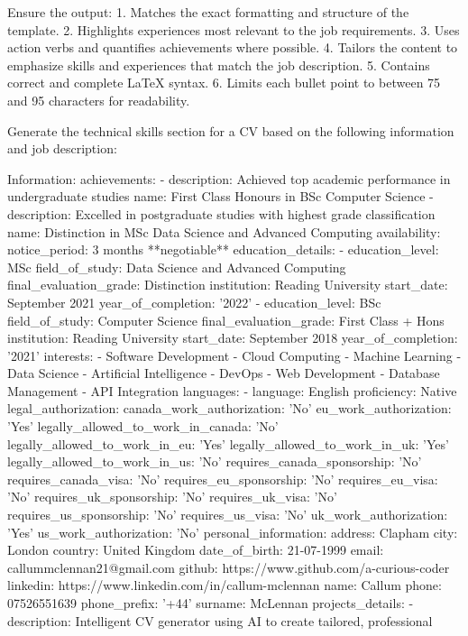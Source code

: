 \documentclass{resume}
\begin{document}
    Ensure the output:
    1. Matches the exact formatting and structure of the template.
    2. Highlights experiences most relevant to the job requirements.
    3. Uses action verbs and quantifies achievements where possible.
    4. Tailors the content to emphasize skills and experiences that match the job description.
    5. Contains correct and complete LaTeX syntax.
    6. Limits each bullet point to between 75 and 95 characters for readability.
    


    Generate the technical skills section for a CV based on the following information and job description:

    Information:
    achievements:
- description: Achieved top academic performance in undergraduate studies
  name: First Class Honours in BSc Computer Science
- description: Excelled in postgraduate studies with highest grade classification
  name: Distinction in MSc Data Science and Advanced Computing
availability:
  notice_period: 3 months **negotiable**
education_details:
- education_level: MSc
  field_of_study: Data Science and Advanced Computing
  final_evaluation_grade: Distinction
  institution: Reading University
  start_date: September 2021
  year_of_completion: '2022'
- education_level: BSc
  field_of_study: Computer Science
  final_evaluation_grade: First Class + Hons
  institution: Reading University
  start_date: September 2018
  year_of_completion: '2021'
interests:
- Software Development
- Cloud Computing
- Machine Learning
- Data Science
- Artificial Intelligence
- DevOps
- Web Development
- Database Management
- API Integration
languages:
- language: English
  proficiency: Native
legal_authorization:
  canada_work_authorization: 'No'
  eu_work_authorization: 'Yes'
  legally_allowed_to_work_in_canada: 'No'
  legally_allowed_to_work_in_eu: 'Yes'
  legally_allowed_to_work_in_uk: 'Yes'
  legally_allowed_to_work_in_us: 'No'
  requires_canada_sponsorship: 'No'
  requires_canada_visa: 'No'
  requires_eu_sponsorship: 'No'
  requires_eu_visa: 'No'
  requires_uk_sponsorship: 'No'
  requires_uk_visa: 'No'
  requires_us_sponsorship: 'No'
  requires_us_visa: 'No'
  uk_work_authorization: 'Yes'
  us_work_authorization: 'No'
personal_information:
  address: Clapham
  city: London
  country: United Kingdom
  date_of_birth: 21-07-1999
  email: callummclennan21@gmail.com
  github: https://www.github.com/a-curious-coder
  linkedin: https://www.linkedin.com/in/callum-mclennan
  name: Callum
  phone: 07526551639
  phone_prefix: '+44'
  surname: McLennan
projects_details:
- description: Intelligent CV generator using AI to create tailored, professional
\end{document}
